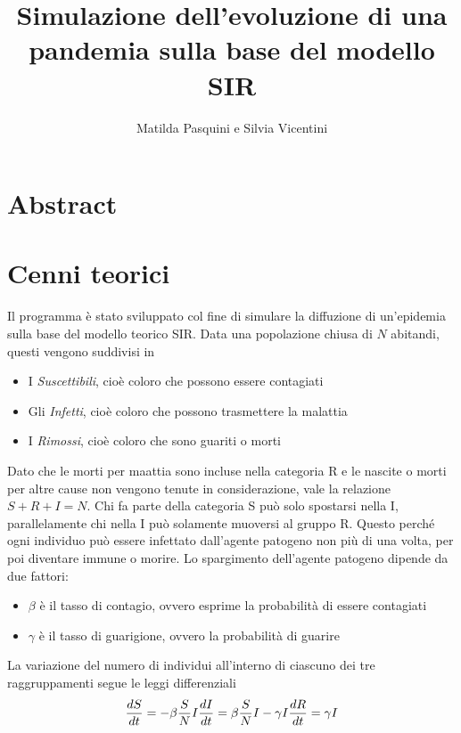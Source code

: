 \documentclass[11pt, a4paper]{article} %
\title{Simulazione dell'evoluzione di una pandemia sulla base del modello SIR}
\author{Matilda Pasquini e Silvia Vicentini}
\begin{document}
\maketitle
\section{Abstract}

\section{Cenni teorici}
Il programma \`{e} stato sviluppato col fine di simulare la diffuzione di un'epidemia sulla base del modello teorico SIR. Data una popolazione chiusa di $N$ abitandi, questi vengono suddivisi in
\begin{itemize}
\item I \textit{Suscettibili}, cio\`{e} coloro che possono essere contagiati
\item Gli \textit{Infetti}, cio\`{e} coloro che possono trasmettere la malattia
\item I \textit{Rimossi}, cio\`{e} coloro che sono guariti o morti
\end{itemize}
Dato che le morti per maattia sono incluse nella categoria R e le nascite o morti per altre cause non vengono tenute in considerazione, vale la relazione $S+R+I=N$. Chi fa parte della categoria S pu\`{o} solo spostarsi nella I, parallelamente chi nella I pu\`{o} solamente muoversi al gruppo R. Questo perch\'e ogni individuo pu\`{o} essere infettato dall'agente patogeno non pi\`{u} di una volta, per poi diventare immune o morire. 
Lo spargimento dell'agente patogeno dipende da due fattori:
\begin{itemize}
\item \textit{$\beta$} \`{e} il tasso di contagio, ovvero esprime la probabilit\`{a} di essere contagiati

\item \textit{$\gamma$} \`{e} il tasso di guarigione, ovvero la probabilit\`{a} di guarire
\end{itemize}
La variazione del numero di individui all'interno di ciascuno dei tre raggruppamenti segue le leggi differenziali
\begin{equation}
\frac{dS}{dt} = -\beta \frac{S}{N}I \\
\frac{dI}{dt} = \beta \frac{S}{N}I-\gamma I  \\ %
\frac{dR}{dt} = \gamma I \\
\end{equation}
\end{document}
